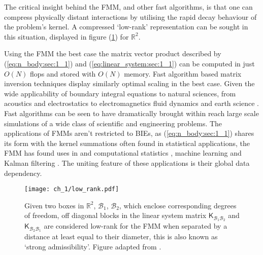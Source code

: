 The critical insight behind the FMM, and other fast algorithms, is that one can compress physically distant interactions by utilising the rapid decay behaviour of the problem's kernel. A compressed `low-rank' representation can be sought in this situation, displayed in figure (\ref{fig:low_rank:sec_1_1}) for $\mathbb{R}^2$.

Using the FMM the best case the matrix vector product described by (\ref{eq:n_body:sec:1_1}) and (\ref{eq:linear_system:sec:1_1}) can be computed in just $O(N)$ \gls{flops} and stored with $O(N)$ memory. Fast algorithm based matrix inversion techniques display similarly optimal scaling in the best case. Given the wide applicability of boundary integral equations to natural sciences, from acoustics \cite{wolf2011aeroacoustic,hao2015efficient} and electrostatics \cite{wang2021high} to electromagnetics \cite{darve2004fast} fluid dynamics \cite{rahimian2010petascale} and earth science \cite{chaillat2008multi}. Fast algorithms can be seen to have dramatically brought within reach large scale simulations of a wide class of scientific and engineering problems. The applications of FMMs aren't restricted to BIEs, as (\ref{eq:n_body:sec:1_1}) shares its form with the kernel summations often found in statistical applications, the FMM has found uses in and computational statistics \cite{ambikasaran2013large}, machine learning \cite{lee2012distributed} and Kalman filtering \cite{li2014kalman}. The uniting feature of these applications is their global data dependency. 

\begin{figure}
    \centering
    \texttt{[image: ch\_1/low\_rank.pdf]}
    \caption{Given two boxes in $\mathbb{R}^2$, $\mathcal{B}_1$, $\mathcal{B}_2$, which enclose corresponding degrees of freedom, off diagonal blocks in the linear system matrix $\mathsf{K}_{\mathcal{B}_1\mathcal{B}_2}$ and $\mathsf{K}_{\mathcal{B}_2\mathcal{B}_1}$ are considered low-rank for the FMM when separated by a distance at least equal to their diameter, this is also known as `strong admissibility'. Figure adapted from \cite{minden2017recursive}.}
    \label{fig:low_rank:sec_1_1}
\end{figure}

